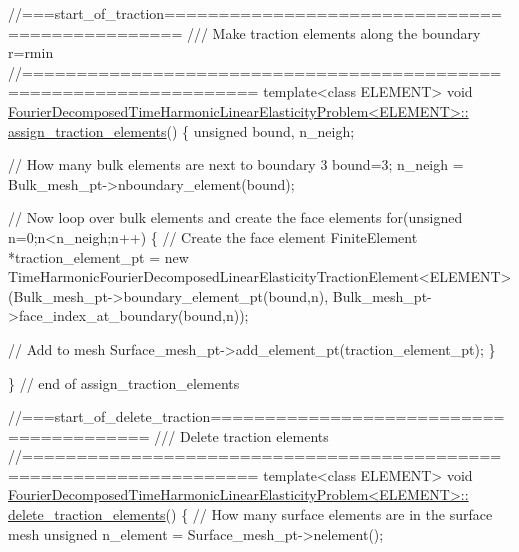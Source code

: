 \begin{DoxyCodeInclude}
\textcolor{comment}{//===start\_of\_traction===============================================}\textcolor{comment}{}
\textcolor{comment}{/// Make traction elements along the boundary r=rmin}
\textcolor{comment}{}\textcolor{comment}{//===================================================================}
\textcolor{keyword}{template}<\textcolor{keyword}{class} ELEMENT>
\textcolor{keywordtype}{void} \hyperlink{classFourierDecomposedTimeHarmonicLinearElasticityProblem_ab995077cbd92377b726d0ea0de81720e}{FourierDecomposedTimeHarmonicLinearElasticityProblem<ELEMENT>::}
\hyperlink{classFourierDecomposedTimeHarmonicLinearElasticityProblem_ab995077cbd92377b726d0ea0de81720e}{assign\_traction\_elements}()
\{
 \textcolor{keywordtype}{unsigned} bound, n\_neigh;

 \textcolor{comment}{// How many bulk elements are next to boundary 3}
 bound=3;
 n\_neigh = Bulk\_mesh\_pt->nboundary\_element(bound); 

 \textcolor{comment}{// Now loop over bulk elements and create the face elements}
 \textcolor{keywordflow}{for}(\textcolor{keywordtype}{unsigned} n=0;n<n\_neigh;n++)
  \{
   \textcolor{comment}{// Create the face element}
   FiniteElement *traction\_element\_pt 
    = \textcolor{keyword}{new} TimeHarmonicFourierDecomposedLinearElasticityTractionElement<ELEMENT>
    (Bulk\_mesh\_pt->boundary\_element\_pt(bound,n),
     Bulk\_mesh\_pt->face\_index\_at\_boundary(bound,n));
 
   \textcolor{comment}{// Add to mesh}
   Surface\_mesh\_pt->add\_element\_pt(traction\_element\_pt);
  \}

\} \textcolor{comment}{// end of assign\_traction\_elements}


\textcolor{comment}{//===start\_of\_delete\_traction========================================}\textcolor{comment}{}
\textcolor{comment}{/// Delete traction elements}
\textcolor{comment}{}\textcolor{comment}{//===================================================================}
\textcolor{keyword}{template}<\textcolor{keyword}{class} ELEMENT>
\textcolor{keywordtype}{void} \hyperlink{classFourierDecomposedTimeHarmonicLinearElasticityProblem_ad51d1870683e0141c7854c583dd3916b}{FourierDecomposedTimeHarmonicLinearElasticityProblem<ELEMENT>::}
\hyperlink{classFourierDecomposedTimeHarmonicLinearElasticityProblem_ad51d1870683e0141c7854c583dd3916b}{delete\_traction\_elements}()
\{
 \textcolor{comment}{// How many surface elements are in the surface mesh}
 \textcolor{keywordtype}{unsigned} n\_element = Surface\_mesh\_pt->nelement();
 

\end{DoxyCodeInclude}
